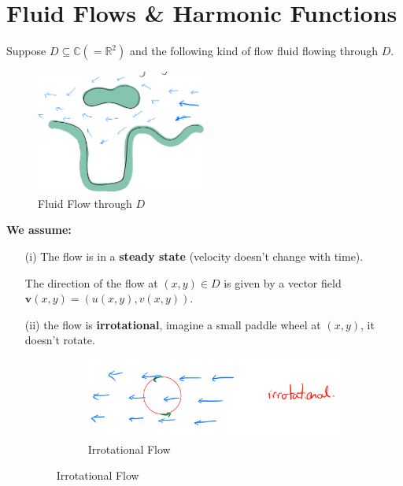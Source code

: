 \chapter{Fluid Flows \& Harmonic Functions}

\begin{proposition}
    Suppose $D \subseteq \mathbb{C} (= \mathbb{R}^2)$ and the following kind of flow fluid flowing through $D$.
    \begin{figure}[H]
        \centering
        \includegraphics[width=0.5\textwidth]{LECTURE_19/graph.png}
        \caption{Fluid Flow through $D$}
    \end{figure}
    \textbf{We assume:}
    \begin{enumerate}
        \item[(i)] The flow is in a \textbf{steady state} (velocity doesn't change with time).
        \item[] The direction of the flow at $(x,y) \in D$ is given by a vector field $\mathbf{v}(x,y) = (u(x,y), v(x,y))$.
        \item[(ii)] the flow is \textbf{irrotational}, imagine a small paddle wheel at $(x,y)$, it doesn't rotate.
        \item[] \begin{figure}[H]
                  \centering
                  \begin{subfigure}{0.4\textwidth}
                      \centering
                      \includegraphics[width=\textwidth]{LECTURE_19/irrotational.png}
                      \caption{Irrotational Flow}
                  \end{subfigure}

\end{figure}
\end{enumerate}
\end{proposition}
